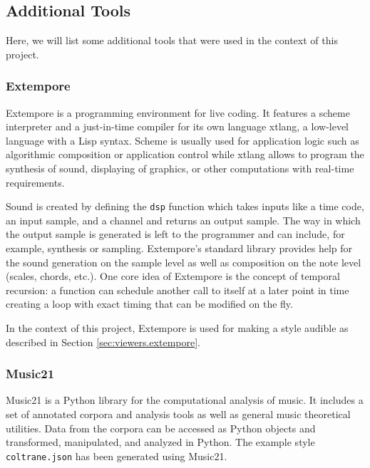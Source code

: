 \subsection{Additional Tools}
\label{sec:tools}

Here, we will list some additional tools that were used in the context of this project.

\subsubsection{Extempore}
\label{sec:tools.extempore}

Extempore \cite{extempore} is a programming environment for live coding.
It features a scheme interpreter and a just-in-time compiler for its own language xtlang, a low-level language with a Lisp syntax.
Scheme is usually used for application logic such as algorithmic composition or application control while xtlang allows to program the synthesis of sound, displaying of graphics, or other computations with real-time requirements.

Sound is created by defining the \texttt{dsp} function which takes inputs like a time code, an input sample, and a channel and returns an output sample.
The way in which the output sample is generated is left to the programmer and can include, for example, synthesis or sampling.
Extempore's standard library provides help for the sound generation on the sample level as well as composition on the note level (scales, chords, etc.).
One core idea of Extempore is the concept of temporal recursion: a function can schedule another call to itself at a later point in time creating a loop with exact timing that can be modified on the fly.

In the context of this project, Extempore is used for making a style audible as described in Section \ref{sec:viewers.extempore}.

\subsubsection{Music21}
\label{sec:tools.music21}

Music21 \cite{music21} is a Python library for the computational analysis of music.
It includes a set of annotated corpora and analysis tools as well as general music theoretical utilities.
Data from the corpora can be accessed as Python objects and transformed, manipulated, and analyzed in Python.
The example style \texttt{coltrane.json} has been generated using Music21.

